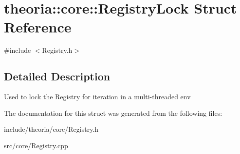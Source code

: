 \hypertarget{structtheoria_1_1core_1_1RegistryLock}{\section{theoria\+:\+:core\+:\+:Registry\+Lock Struct Reference}
\label{structtheoria_1_1core_1_1RegistryLock}
}


{\ttfamily \#include $<$Registry.\+h$>$}



\subsection{Detailed Description}
Used to lock the \hyperlink{classtheoria_1_1core_1_1Registry}{Registry} for iteration in a multi-\/threaded env 

The documentation for this struct was generated from the following files\+:\begin{DoxyCompactItemize}
\item 
include/theoria/core/Registry.\+h\item 
src/core/Registry.\+cpp\end{DoxyCompactItemize}
